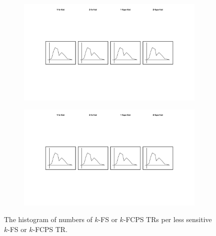 \begin{figure}
\begin{subfigure}{0.24\textwidth}
  \end{subfigure}
  \begin{subfigure}{0.24\textwidth}
    \centering
    \includegraphics[width=\textwidth]{img/1-fcps-hist}
  \end{subfigure}
  \begin{subfigure}{0.24\textwidth}
    \centering
    \includegraphics[width=\textwidth]{img/2-fcps-hist}
  \end{subfigure}
  \caption{
    The histogram of numbers of $k$-FS or $k$-FCPS TRs per less sensitive $k$-FS
    or $k$-FCPS TR.
  }
  \label{fig:hist}
\end{figure}


